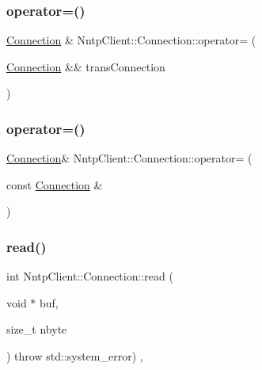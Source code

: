 \hypertarget{class_nntp_client_1_1_connection_af23500ee46f48a9ae8b724d4169ea853}{}\label{class_nntp_client_1_1_connection_af23500ee46f48a9ae8b724d4169ea853} 
\subsubsection{\texorpdfstring{operator=()}{operator=()}\hspace{0.1cm}{\footnotesize\ttfamily [1/2]}}
{\footnotesize\ttfamily \hyperlink{class_nntp_client_1_1_connection}{Connection} \& Nntp\+Client\+::\+Connection\+::operator= (\begin{DoxyParamCaption}\item[{\hyperlink{class_nntp_client_1_1_connection}{Connection} \&\&}]{trans\+Connection }\end{DoxyParamCaption})\hspace{0.3cm}{\ttfamily [virtual]}}

\hypertarget{class_nntp_client_1_1_connection_af71eb88c036281c8e6e712831c1f94f8}{}\label{class_nntp_client_1_1_connection_af71eb88c036281c8e6e712831c1f94f8} 
\subsubsection{\texorpdfstring{operator=()}{operator=()}\hspace{0.1cm}{\footnotesize\ttfamily [2/2]}}
{\footnotesize\ttfamily \hyperlink{class_nntp_client_1_1_connection}{Connection}\& Nntp\+Client\+::\+Connection\+::operator= (\begin{DoxyParamCaption}\item[{const \hyperlink{class_nntp_client_1_1_connection}{Connection} \&}]{ }\end{DoxyParamCaption})\hspace{0.3cm}{\ttfamily [delete]}}

\hypertarget{class_nntp_client_1_1_connection_aed3df70a3839498d0fd3080be9be35d6}{}\label{class_nntp_client_1_1_connection_aed3df70a3839498d0fd3080be9be35d6} 
\subsubsection{\texorpdfstring{read()}{read()}}
{\footnotesize\ttfamily int Nntp\+Client\+::\+Connection\+::read (\begin{DoxyParamCaption}\item[{void $\ast$}]{buf,  }\item[{size\+\_\+t}]{nbyte }\end{DoxyParamCaption}) throw  std\+::system\+\_\+error) \hspace{0.3cm}{\ttfamily [protected]}, {\ttfamily [virtual]}}

